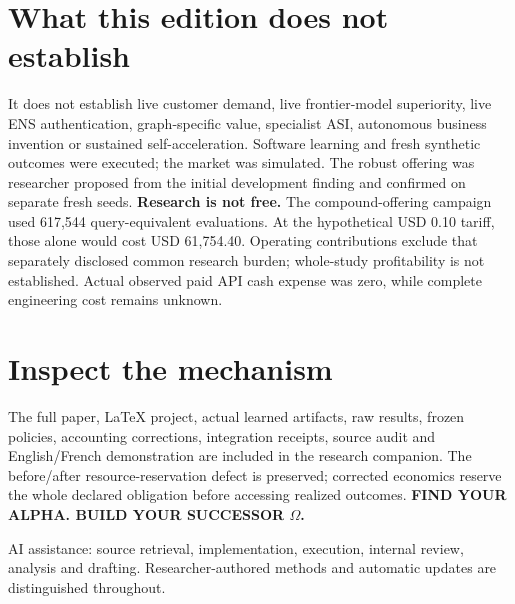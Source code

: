 \documentclass[11pt,letterpaper]{article}
\begin{document}
\section*{What this edition does not establish}
It does not establish live customer demand, live frontier-model superiority, live ENS authentication, graph-specific value, specialist ASI, autonomous business invention or sustained self-acceleration. Software learning and fresh synthetic outcomes were executed; the market was simulated. The robust offering was researcher proposed from the initial development finding and confirmed on separate fresh seeds.
\textbf{Research is not free.} The compound-offering campaign used 617,544 query-equivalent evaluations. At the hypothetical USD 0.10 tariff, those alone would cost USD 61,754.40. Operating contributions exclude that separately disclosed common research burden; whole-study profitability is not established. Actual observed paid API cash expense was zero, while complete engineering cost remains unknown.
\section*{Inspect the mechanism}
The full paper, LaTeX project, actual learned artifacts, raw results, frozen policies, accounting corrections, integration receipts, source audit and English/French demonstration are included in the research companion. The before/after resource-reservation defect is preserved; corrected economics reserve the whole declared obligation before accessing realized outcomes.
\vfill
\textbf{FIND YOUR ALPHA. BUILD YOUR SUCCESSOR $\Omega$.}\par
AI assistance: source retrieval, implementation, execution, internal review, analysis and drafting. Researcher-authored methods and automatic updates are distinguished throughout.
\end{document}
